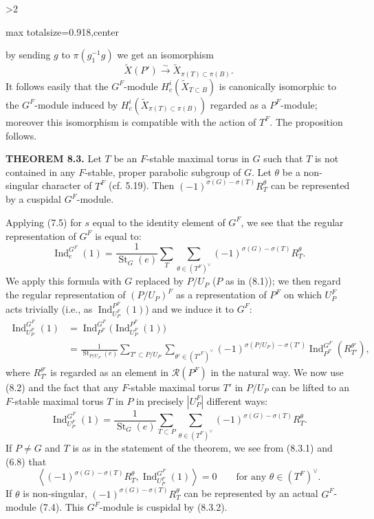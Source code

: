 \documentclass[9pt,twoside]{extarticle}
\newcommand{\EditionPage}[3]{%
  \ifnum#1>2\clearpage\fi
  \pdfbookmark[1]{Printed page #2}{en-folio-#2}%
  \hypertarget{en-physical-#1}{}%
  \noindent\begin{adjustbox}{max totalsize={\textwidth}{0.918\textheight},center}
  \begin{minipage}[t]{\textwidth}
  \fontsize{9.4}{11.1}\selectfont\justifying
  #3
  \end{minipage}
  \end{adjustbox}%
}
\begin{document}
\EditionPage{46}{147}{%
by sending \(g\) to \(\pi(g_1^{-1}g)\) we get an isomorphism \[
\widetilde X(P')\xrightarrow{\sim}\widetilde X_{\pi(T)\subset\pi(B)}.
\] It follows easily that the \(G^F\)-module \(H_c^i(\widetilde X_{T\subset B})\) is canonically isomorphic to the \(G^F\)-module induced by \(H_c^i(\widetilde X_{\pi(T)\subset\pi(B)})\) regarded as a \(P^F\)-module; moreover this isomorphism is compatible with the action of \(T^F\). The proposition follows.\par

\noindent\textbf{THEOREM 8.3.} Let \(T\) be an \(F\)-stable maximal torus in \(G\) such that \(T\) is not contained in any \(F\)-stable, proper parabolic subgroup of \(G\). Let \(\theta\) be a non-singular character of \(T^F\) (cf. 5.19). Then \((-1)^{\sigma(G)-\sigma(T)}R_T^\theta\) can be represented by a cuspidal \(G^F\)-module.\par

Applying (7.5) for \(s\) equal to the identity element of \(G^F\), we see that the regular representation of \(G^F\) is equal to: \[
\operatorname{Ind}_e^{G^F}(1)
=
\frac1{\operatorname{St}_G(e)}
\sum_T\sum_{\theta\in(T^F)^\vee}
(-1)^{\sigma(G)-\sigma(T)}R_T^\theta.
\] We apply this formula with \(G\) replaced by \(P/U_P\) (\(P\) as in (8.1)); we then regard the regular representation of \((P/U_P)^F\) as a representation of \(P^F\) on which \(U_P^F\) acts trivially (i.e., as \(\operatorname{Ind}_{U_P^F}^{P^F}(1)\)) and we induce it to \(G^F\): \[
\begin{aligned}
\operatorname{Ind}_{U_P^F}^{G^F}(1)
&=\operatorname{Ind}_{P^F}^{G^F}\bigl(\operatorname{Ind}_{U_P^F}^{P^F}(1)\bigr)\\
&=\frac1{\operatorname{St}_{P/U_P}(e)}
\sum_{T'\subset P/U_P}
\sum_{\theta'\in(T'^F)^\vee}
(-1)^{\sigma(P/U_P)-\sigma(T')}
\operatorname{Ind}_{P^F}^{G^F}(R_{T'}^{\theta'}),
\end{aligned}
\] where \(R_{T'}^{\theta'}\) is regarded as an element in \(\mathcal R(P^F)\) in the natural way. We now use (8.2) and the fact that any \(F\)-stable maximal torus \(T'\) in \(P/U_P\) can be lifted to an \(F\)-stable maximal torus \(T\) in \(P\) in precisely \(|U_P^F|\) different ways: \[
\tag{8.3.1}
\operatorname{Ind}_{U_P^F}^{G^F}(1)
=
\frac1{\operatorname{St}_G(e)}
\sum_{T\subset P}
\sum_{\theta\in(T^F)^\vee}
(-1)^{\sigma(G)-\sigma(T)}R_T^\theta.
\] If \(P\ne G\) and \(T\) is as in the statement of the theorem, we see from (8.3.1) and (6.8) that \[
\tag{8.3.2}
\left\langle(-1)^{\sigma(G)-\sigma(T)}R_T^\theta,
\operatorname{Ind}_{U_P^F}^{G^F}(1)\right\rangle=0
\qquad\text{for any }\theta\in(T^F)^\vee.
\] If \(\theta\) is non-singular, \((-1)^{\sigma(G)-\sigma(T)}R_T^\theta\) can be represented by an actual \(G^F\)-module (7.4). This \(G^F\)-module is cuspidal by (8.3.2).\par

}
\end{document}
